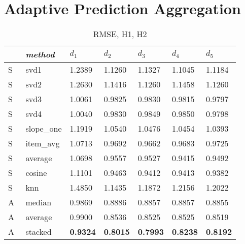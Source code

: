 \clearpage

\section{Adaptive Prediction Aggregation}

\begin{table}
  \begin{tabular*}{\textwidth}{ l p{3cm} p{1.5cm} p{1.5cm} p{1.5cm} p{1.5cm} p{1.5cm} }
    \toprule
      ~ & \emph{method} & 
      $d_1$ & $d_2$ & $d_3$ & $d_4$ & $d_5$ \\ 
    \midrule
    S & svd1          & 1.2389	  & 1.1260	  & 1.1327	  & 1.1045	  & 1.1184	 \\
    S & svd2          & 1.2630	  & 1.1416    & 1.1260	  & 1.1458	  & 1.1260	 \\
    S & svd3          & 1.0061	  & 0.9825	  & 0.9830	  & 0.9815	  & 0.9797	 \\
    S & svd4          & 1.0040	  & 0.9830	  & 0.9849	  & 0.9850	  & 0.9798	 \\
    S & slope\_one    & 1.1919	  & 1.0540	  & 1.0476	  & 1.0454	  & 1.0393   \\
    S & item\_avg     & 1.0713	  & 0.9692	  & 0.9662	  & 0.9683	  & 0.9725	 \\
    S & average       & 1.0698	  & 0.9557	  & 0.9527	  & 0.9415	  & 0.9492	 \\
    S & cosine   	    & 1.1101	  & 0.9463	  & 0.9412	  & 0.9413	  & 0.9382	 \\
    S & knn       	  & 1.4850	  & 1.1435	  & 1.1872    & 1.2156	  & 1.2022	 \\
    \midrule                                                                    
    A & median    	  & 0.9869	  & 0.8886	  & 0.8857    & 0.8857	  & 0.8855	 \\
    A & average    	  & 0.9900	  & 0.8536	  & 0.8525	  & 0.8525	  & 0.8519	 \\
    A & stacked       & \textbf{0.9324}	  & \textbf{0.8015}	  & \textbf{0.7993}  & \textbf{0.8238} & \textbf{0.8192} \\
    \bottomrule
  \end{tabular*}
  \caption[Results]{RMSE, H1, H2}
  \label{table:results:h2}
\end{table}


